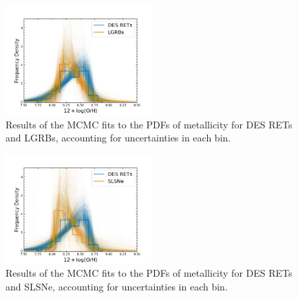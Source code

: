 \documentclass[fleqn,usenatbib,]{mnras}
\begin{document}
\begin{figure}
\includegraphics[width=0.5\textwidth]{mc_figs/rets_k15_OH_histfit_final.png}
\caption{Results of the MCMC fits to the PDFs of metallicity for DES RETs and LGRBs, accounting for uncertainties in each bin.
\label{fig:histfit_oh_k15}}
\end{figure}

\begin{figure}
\includegraphics[width=0.5\textwidth]{mc_figs/rets_p16_OH_histfit_final.png}
\caption{Results of the MCMC fits to the PDFs of metallicity for DES RETs and SLSNe, accounting for uncertainties in each bin.
\label{fig:histfit_oh_p16}}
\end{figure}


\bsp	%
\label{lastpage}
\end{document}
